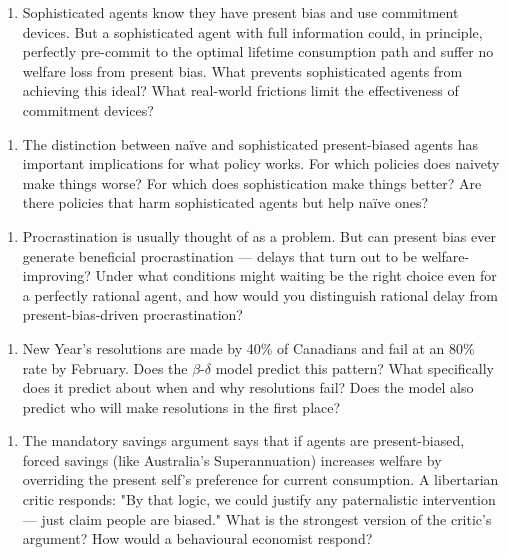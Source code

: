 \documentclass[12pt, letterpaper]{article}
\begin{document}
\begin{enumerate}
\item Sophisticated agents know they have present bias and use commitment devices. But a sophisticated agent with full information could, in principle, perfectly pre-commit to the optimal lifetime consumption path and suffer no welfare loss from present bias. What prevents sophisticated agents from achieving this ideal? What real-world frictions limit the effectiveness of commitment devices?
\end{enumerate}

\begin{enumerate}
\item The distinction between naïve and sophisticated present-biased agents has important implications for what policy works. For which policies does naivety make things worse? For which does sophistication make things better? Are there policies that harm sophisticated agents but help naïve ones?
\end{enumerate}

\begin{enumerate}
\item Procrastination is usually thought of as a problem. But can present bias ever generate beneficial procrastination --- delays that turn out to be welfare-improving? Under what conditions might waiting be the right choice even for a perfectly rational agent, and how would you distinguish rational delay from present-bias-driven procrastination?
\end{enumerate}

\begin{enumerate}
\item New Year's resolutions are made by 40\% of Canadians and fail at an 80\% rate by February. Does the $\beta$-$\delta$ model predict this pattern? What specifically does it predict about when and why resolutions fail? Does the model also predict who will make resolutions in the first place?
\end{enumerate}

\begin{enumerate}
\item The mandatory savings argument says that if agents are present-biased, forced savings (like Australia's Superannuation) increases welfare by overriding the present self's preference for current consumption. A libertarian critic responds: "By that logic, we could justify any paternalistic intervention --- just claim people are biased." What is the strongest version of the critic's argument? How would a behavioural economist respond?
\end{enumerate}
\end{document}
